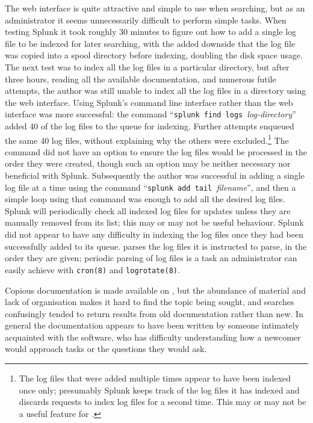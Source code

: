 The web interface is quite attractive and simple to use when searching, but
as an administrator it seems unnecessarily difficult to perform simple
tasks.  When testing Splunk it took roughly 30 minutes to figure out how to
add a single log file to be indexed for later searching, with the added
downside that the log file was copied into a spool directory before
indexing, doubling the disk space usage.  The next test was to index all
the log files in a particular directory, but after three hours, reading all
the available documentation, and numerous futile attempts, the author was
still unable to index all the log files in a directory using the web
interface.  Using Splunk's command line interface rather than the web
interface was more successful: the command ``\texttt{splunk find logs
}\textit{log-directory\/}'' added 40 of the \numberOFlogFILES{} log files
to the queue for indexing.  Further attempts enqueued the same 40 log
files, without explaining why the others were excluded.\footnote{The log
files that were added multiple times appear to have been indexed once only;
presumably Splunk keeps track of the log files it has indexed and discards
requests to index log files for a second time.  This may or may not be a
useful feature for \parsername{}.}  The command did not have an option to
ensure the log files would be processed in the order they were created,
though such an option may be neither necessary nor beneficial with Splunk.
Subsequently the author was successful in adding a single log file at a
time using the command ``\texttt{splunk add tail }\textit{filename\/}'',
and then a simple loop using that command was enough to add all the desired
log files.  Splunk will periodically check all indexed log files for
updates unless they are manually removed from its list; this may or may not
be useful behaviour.  Splunk did not appear to have any difficulty in
indexing the log files once they had been successfully added to its queue.
\parsername{} parses the log files it is instructed to parse, in the order
they are given; periodic parsing of log files is a task an administrator
can easily achieve with \texttt{cron(8)} and \texttt{logrotate(8)}.

Copious documentation is made available on
, but the abundance of
material and lack of organisation makes it hard to find the topic being
sought, and searches confusingly tended to return results from old
documentation rather than new.  In general the documentation appears to
have been written by someone intimately acquainted with the software, who
has difficulty understanding how a newcomer would approach tasks or the
questions they would ask.

